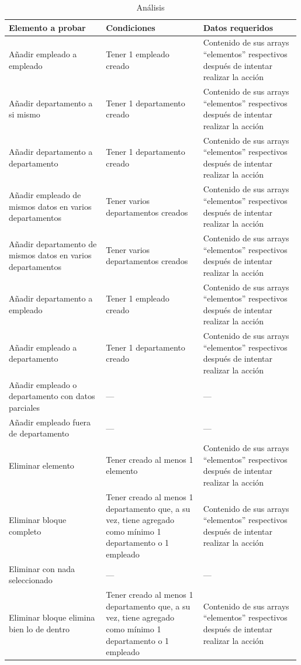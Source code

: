 \documentclass[openany]{article}
\begin{document}
\begin{table}[H]
    \centering
    \begin{tabular}{|>{\raggedright\arraybackslash}p{0.33\linewidth}|>{\raggedright\arraybackslash}p{0.33\linewidth}|>{\raggedright\arraybackslash}p{0.33\linewidth}|} \hline 
        \textbf{Elemento a probar} & \textbf{Condiciones} & \textbf{Datos requeridos}\\ \hline 
        Añadir empleado a empleado &  Tener 1 empleado creado& Contenido de sus arrays “elementos” respectivos después de intentar realizar la acción\\ \hline
        Añadir departamento a si mismo &  Tener 1 departamento creado& Contenido de sus arrays “elementos” respectivos después de intentar realizar la acción\\ \hline 
        Añadir departamento a departamento &  Tener 1 departamento creado& Contenido de sus arrays “elementos” respectivos después de intentar realizar la acción\\ \hline 
        Añadir empleado de mismos datos en varios departamentos &  Tener varios departamentos creados& Contenido de sus arrays “elementos” respectivos después de intentar realizar la acción\\ \hline 
        Añadir departamento de mismos datos en varios departamentos &  Tener varios departamentos creados& Contenido de sus arrays “elementos” respectivos después de intentar realizar la acción\\ \hline 
        Añadir departamento a empleado &  Tener 1 empleado creado& Contenido de sus arrays “elementos” respectivos después de intentar realizar la acción\\ \hline 
        Añadir empleado a departamento &  Tener 1 departamento creado& Contenido de sus arrays “elementos” respectivos después de intentar realizar la acción\\ \hline 
        Añadir empleado o departamento con datos parciales &  ---& ---\\ \hline 
        Añadir empleado fuera de departamento &  ---& ---\\ \hline 
        Eliminar elemento &  Tener creado al menos 1 elemento& Contenido de sus arrays “elementos” respectivos después de intentar realizar la acción\\ \hline 
        Eliminar bloque completo &  Tener creado al menos 1 departamento que, a su vez, tiene agregado como mínimo 1 departamento o 1 empleado& Contenido de sus arrays “elementos” respectivos después de intentar realizar la acción\\ \hline 
        Eliminar con nada seleccionado &  ---& ---\\ \hline 
        Eliminar bloque elimina bien lo de dentro &  Tener creado al menos 1 departamento que, a su vez, tiene agregado como mínimo 1 departamento o 1 empleado& Contenido de sus arrays “elementos” respectivos después de intentar realizar la acción\\ \hline
    \end{tabular}
    \caption{Análisis}
    \label{tab:analisis}
\end{table}
\pagebreak
{}
\end{document}
